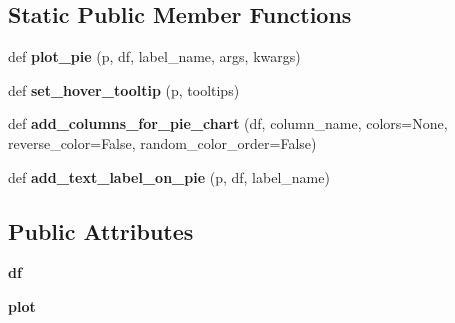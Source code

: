 \subsection*{Static Public Member Functions}
\begin{DoxyCompactItemize}
\item 
\mbox{\label{classapp_1_1main_1_1boksplots_1_1custompie_1_1CustomPieBuilder_af0edef2b36a14326bdf87afe5d652035}} 
def {\bfseries plot\+\_\+pie} (p, df, label\+\_\+name, args, kwargs)
\item 
\mbox{\label{classapp_1_1main_1_1boksplots_1_1custompie_1_1CustomPieBuilder_ab710a02880adebb9173a1bb67bc0a5b3}} 
def {\bfseries set\+\_\+hover\+\_\+tooltip} (p, tooltips)
\item 
\mbox{\label{classapp_1_1main_1_1boksplots_1_1custompie_1_1CustomPieBuilder_abc69d564224c99c2c0f66d28d85d66e1}} 
def {\bfseries add\+\_\+columns\+\_\+for\+\_\+pie\+\_\+chart} (df, column\+\_\+name, colors=None, reverse\+\_\+color=False, random\+\_\+color\+\_\+order=False)
\item 
\mbox{\label{classapp_1_1main_1_1boksplots_1_1custompie_1_1CustomPieBuilder_a16ec42edb5251960fd6abadd7728f3da}} 
def {\bfseries add\+\_\+text\+\_\+label\+\_\+on\+\_\+pie} (p, df, label\+\_\+name)
\end{DoxyCompactItemize}
\subsection*{Public Attributes}
\begin{DoxyCompactItemize}
\item 
\mbox{\label{classapp_1_1main_1_1boksplots_1_1custompie_1_1CustomPieBuilder_a794192b13af422ca19c0a017dd308eca}} 
{\bfseries df}
\item 
\mbox{\label{classapp_1_1main_1_1boksplots_1_1custompie_1_1CustomPieBuilder_a1dd0197d210d923d64452d885debbce3}} 
{\bfseries plot}
\end{DoxyCompactItemize}
